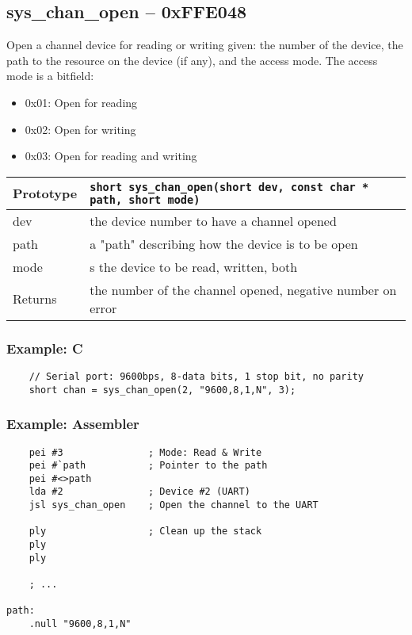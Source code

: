 \subsection*{sys\_chan\_open -- 0xFFE048}
Open a channel device for reading or writing given: the number of the device, the path to the resource on the device (if any), and the access mode. The access mode is a bitfield:
\begin{itemize}
    \item 0x01: Open for reading
    \item 0x02: Open for writing
    \item 0x03: Open for reading and writing
\end{itemize}

\bigskip

\begin{tabular}{|l||l|} \hline
Prototype & \lstinline!short sys_chan_open(short dev, const char * path, short mode)! \\ \hline
dev & the device number to have a channel opened \\ \hline
path & a "path" describing how the device is to be open \\ \hline
mode & s the device to be read, written, both\\ \hline
Returns & the number of the channel opened, negative number on error \\ \hline
\end{tabular}

\subsubsection*{Example: C}
\begin{lstlisting}
    // Serial port: 9600bps, 8-data bits, 1 stop bit, no parity
    short chan = sys_chan_open(2, "9600,8,1,N", 3);    
\end{lstlisting}

\subsubsection*{Example: Assembler}
\begin{verbatim}
    pei #3               ; Mode: Read & Write
    pei #`path           ; Pointer to the path
    pei #<>path
    lda #2               ; Device #2 (UART)
    jsl sys_chan_open    ; Open the channel to the UART

    ply                  ; Clean up the stack
    ply
    ply

    ; ...

path:
    .null "9600,8,1,N"
\end{verbatim}



